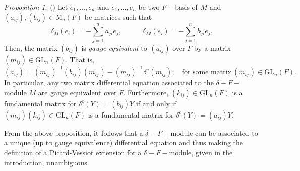 \documentclass[preprint, 11pt]{amsart}
\theoremstyle{corollary}
\theoremstyle{remark}
\theoremstyle{proposition}
\newtheorem{proposition}[theorem]{Proposition}
\numberwithin{equation}{subsection}
\begin{document}
	\begin{proposition} \label{gaugeequivalence}(\cite[Section 1.2, p.7]{MvdP03})
		Let  $e_1,\dots, e_n$ and $\tilde{e}_1,\dots,\tilde{e}_n$ be two $F-$basis of $M$ and $(a_{ij}), (b_{ij})\in \mathrm{M}_n(F)$ be matrices  such that  $$\delta_M(e_i)=-\sum^n_{j=1}a_{ji} e_j,\quad\qquad \delta_M(\tilde{e}_i)=-\sum^n_{j=1}b_{ji} \tilde{e}_j.$$ Then, the matrix $(b_{ij})$  is \emph{gauge equivalent} to $(a_{ij})$ over $F$ by a matrix $(m_{ij})\in\mathrm{GL}_n(F).$ That is, $$(a_{ij})=(m_{ij})^{-1}(b_{ij})(m_{ij})-(m_{ij})^{-1}\delta^c(m_{ij}); \quad \text{for some matrix} \ (m_{ij})\in\mathrm{GL}_n(F).$$  In particular, any two matrix differential equation associated to the $\delta-F-$module $M$ are gauge equivalent over $F.$ Furthermore,  $(k_{ij})\in \mathrm{GL}_n(F)$ is a fundamental matrix for $\delta^c(Y)=(b_{ij})Y$ if and only if $(m_{ij})(k_{ij})\in \mathrm{GL}_n(F)$ is a fundamental matrix for $\delta^c(Y)=(a_{ij})Y.$
	\end{proposition}


From the above proposition, it follows that a $\delta-F-$module can be associated to a unique (up to gauge equivalence) differential equation and thus making the definition of a Picard-Vessiot extension for a  $\delta-F-$module, given in the introduction, unambiguous.  


\end{document}
